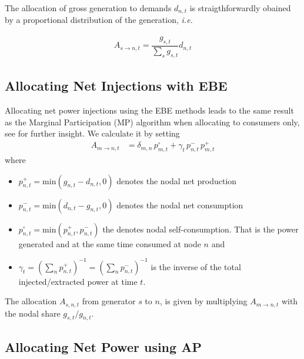 \documentclass[11pt,twocolumn]{article}
\newcommand{\ie}{\textit{i.e.} }
\newcommand{\generation}{g_{s,t}}
\newcommand{\nodalgeneration}[1][n]{g_{#1,t}}
\newcommand{\demand}[1][n]{d_{#1,t}}
\newcommand{\nodaldemand}[1][n]{d_{#1,t}}
\newcommand{\injection}{p_{n,t}}
\newcommand{\netconsumption}[1][n]{p^{-}_{#1,t}}
\newcommand{\netproduction}[1][n]{p^{+}_{#1,t}}
\newcommand{\selfconsumption}[1][n]{p^{\circ}_{#1,t}}
\newcommand{\allocatepeer}[1][s, n]{A_{#1,t}}
\begin{document}
The allocation of gross generation to demands $\demand$ is straigthforwardly obained by a proportional distribution of the generation, \ie

\begin{align}
    \allocatepeer[s \rightarrow n] = \dfrac{\generation}{\sum_s \generation} \demand 
\end{align}


\subsection{Allocating Net Injections with EBE}
\label{sec:net_ebe}

Allocating net power injections using the EBE methods leads to the same result as the Marginal Participation (MP) \cite{rudnick_marginal_1995}  algorithm when allocating to consumers only, see \cite{hofmann_flow_2020-1} for further insight. We calculate it by setting 
\begin{align}
\allocatepeer[m \rightarrow n] &=  \delta_{m,n}\,\selfconsumption[m] + \gamma_t \, \netconsumption  \, \netproduction[m]
\label{eq:mp_slack}
\end{align}
where 
\begin{itemize}
\item $\netproduction = \text{min}\left( \nodalgeneration - \nodaldemand , 0 \right) $ denotes the nodal net production 
\item $\netconsumption = \text{min}\left( \nodaldemand  - \nodalgeneration, 0 \right)$ denotes the nodal net consumption
\item $\selfconsumption = \text{min}\left( \netproduction, \netconsumption \right)$ the denotes  nodal self-consumption. That is the power generated and at the same time consumed at node $n$ and 
\item $\gamma_t = \left( \sum_n \netproduction\right) ^{-1} = \left( \sum_n \netconsumption\right) ^{-1}$ is the inverse of the total injected/extracted power at time $t$.
\end{itemize}

The allocation $\allocatepeer$ from generator $s$ to $n$, is given by multiplying $\allocatepeer[m \rightarrow n]$ with the nodal share $\generation / \nodalgeneration$.


\subsection{Allocating Net Power using AP}
\label{sec:net_ap}
\end{document}
